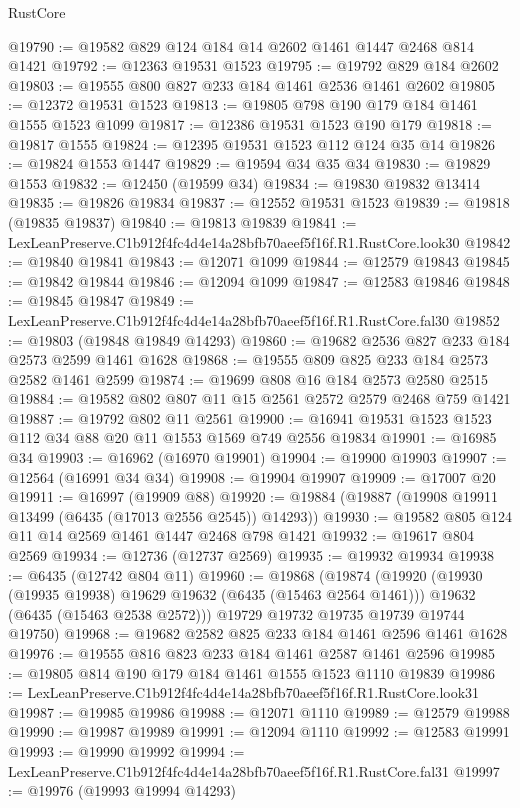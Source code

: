 \begin{lexlean}{RustCore}
\begin{coremodule}
@19790 := @19582 @829 @124 @184 @14 @2602 @1461 @1447 @2468 @814 @1421
@19792 := @12363 @19531 @1523
@19795 := @19792 @829 @184 @2602
@19803 := @19555 @800 @827 @233 @184 @1461 @2536 @1461 @2602
@19805 := @12372 @19531 @1523
@19813 := @19805 @798 @190 @179 @184 @1461 @1555 @1523 @1099
@19817 := @12386 @19531 @1523 @190 @179
@19818 := @19817 @1555
@19824 := @12395 @19531 @1523 @112 @124 @35 @14
@19826 := @19824 @1553 @1447
@19829 := @19594 @34 @35 @34
@19830 := @19829 @1553
@19832 := @12450 (@19599 @34)
@19834 := @19830 @19832 @13414
@19835 := @19826 @19834
@19837 := @12552 @19531 @1523
@19839 := @19818 (@19835 @19837)
@19840 := @19813 @19839
@19841 := LexLeanPreserve.C1b912f4fc4d4e14a28bfb70aeef5f16f.R1.RustCore.look30
@19842 := @19840 @19841
@19843 := @12071 @1099
@19844 := @12579 @19843
@19845 := @19842 @19844
@19846 := @12094 @1099
@19847 := @12583 @19846
@19848 := @19845 @19847
@19849 := LexLeanPreserve.C1b912f4fc4d4e14a28bfb70aeef5f16f.R1.RustCore.fal30
@19852 := @19803 (@19848 @19849 @14293)
@19860 := @19682 @2536 @827 @233 @184 @2573 @2599 @1461 @1628
@19868 := @19555 @809 @825 @233 @184 @2573 @2582 @1461 @2599
@19874 := @19699 @808 @16 @184 @2573 @2580 @2515
@19884 := @19582 @802 @807 @11 @15 @2561 @2572 @2579 @2468 @759 @1421
@19887 := @19792 @802 @11 @2561
@19900 := @16941 @19531 @1523 @1523 @112 @34 @88 @20 @11 @1553 @1569 @749 @2556 @19834
@19901 := @16985 @34
@19903 := @16962 (@16970 @19901)
@19904 := @19900 @19903
@19907 := @12564 (@16991 @34 @34)
@19908 := @19904 @19907
@19909 := @17007 @20
@19911 := @16997 (@19909 @88)
@19920 := @19884 (@19887 (@19908 @19911 @13499 (@6435 (@17013 @2556 @2545)) @14293))
@19930 := @19582 @805 @124 @11 @14 @2569 @1461 @1447 @2468 @798 @1421
@19932 := @19617 @804 @2569
@19934 := @12736 (@12737 @2569)
@19935 := @19932 @19934
@19938 := @6435 (@12742 @804 @11)
@19960 := @19868
    (@19874
      (@19920
        (@19930 (@19935 @19938) @19629 @19632 (@6435 (@15463 @2564 @1461)))
        @19632
        (@6435 (@15463 @2538 @2572)))
      @19729
      @19732
      @19735
      @19739
      @19744
      @19750)
@19968 := @19682 @2582 @825 @233 @184 @1461 @2596 @1461 @1628
@19976 := @19555 @816 @823 @233 @184 @1461 @2587 @1461 @2596
@19985 := @19805 @814 @190 @179 @184 @1461 @1555 @1523 @1110 @19839
@19986 := LexLeanPreserve.C1b912f4fc4d4e14a28bfb70aeef5f16f.R1.RustCore.look31
@19987 := @19985 @19986
@19988 := @12071 @1110
@19989 := @12579 @19988
@19990 := @19987 @19989
@19991 := @12094 @1110
@19992 := @12583 @19991
@19993 := @19990 @19992
@19994 := LexLeanPreserve.C1b912f4fc4d4e14a28bfb70aeef5f16f.R1.RustCore.fal31
@19997 := @19976 (@19993 @19994 @14293)

\end{coremodule}
\end{lexlean}
